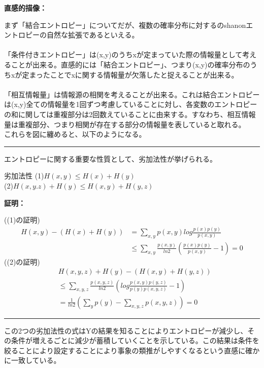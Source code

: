\documentclass[a4paper,10.5pt]{article}
\numberwithin{equation}{section}
\newenvironment{proofbox}
{\begin{prooflabel}\textbf{証明：}\end{prooflabel}\vspace{0.8em}}
{\par\vspace{1em}\hrule\vspace{1em}}
\newenvironment{intuitionbox}
{\begin{prooflabel}\textbf{直感的描像：}\end{prooflabel}\vspace{0.8em}}
{\par\vspace{1em}\hrule\vspace{1em}}
\begin{document}
\begin{intuitionbox}
まず「結合エントロピー」についてだが、複数の確率分布に対するのshanonエントロピーの自然な拡張であるといえる。\\
\\
「条件付きエントロピー」は(x,y)のうちxが定まっていた際の情報量として考えることが出来る。直感的には「結合エントロピー」、つまり(x,y)の確率分布のうちxが定まったことでxに関する情報量が欠落したと捉えることが出来る。\\
\\
「相互情報量」は情報源の相関を考えることが出来る。これは結合エントロピーは(x,y)全ての情報量を1回ずつ考慮していることに対し、各変数のエントロピーの和に関しては重複部分は2回数えていることに由来する。すなわち、相互情報量は重複部分、つまり相関が存在する部分の情報量を表していると取れる。\\
これらを図に纏めると、以下のようになる。
\end{intuitionbox}
エントロピーに関する重要な性質として、劣加法性が挙げられる。
\begin{theorembox}{劣加法性}
(1)$H(x,y)\leq H(x)+H(y)$\\
(2)$H(x,y.z)+H(y)\leq H(x,y)+H(y,z)$
\end{theorembox}
\begin{proofbox}
((1)の証明)
\begin{equation}\begin{split}
    H(x,y)-(H(x)+H(y)) &= \sum_{x,y}p(x,y)log\frac{p(x)p(y)}{p(x,y)}\\
    &\leq \sum_{x,y} \frac{p(x,y)}{ln2}(\frac{p(x)p(y)}{p(x,y)}-1)
    =0
\end{split} \end{equation}
((2)の証明)
\begin{equation}\begin{split}
    &H(x,y,z)+H(y)-(H(x,y)+H(y,z)) \\
    &\leq \sum_{x,y,z}\frac{p(x,y,z)}{ln2}(log\frac{p(x,y)p(y,z)}{p(y)p(x,y,z)}-1)\\
    &=\frac{1}{ln2}(\sum_{y}p(y)-\sum_{x,y,z}p(x,y,z))=0
\end{split} \end{equation}
\end{proofbox}
この2つの劣加法性の式はYの結果を知ることによりエントロピーが減少し、その条件が増えるごとに減少が蓄積していくことを示している。この結果は条件を絞ることにより設定することにより事象の類推がしやすくなるという直感に確かに一致している。
\end{document}
